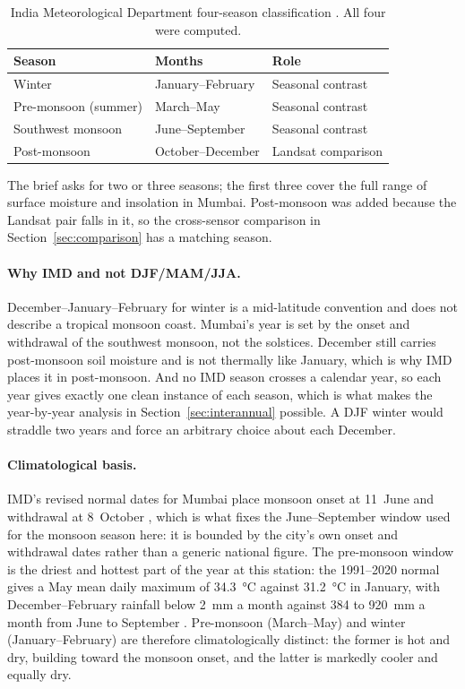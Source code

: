 \documentclass[11pt,a4paper]{article}
\begin{document}
\begin{table}[htbp]
\centering
\begin{tabular}{lll}
\toprule
\textbf{Season} & \textbf{Months} & \textbf{Role} \\
\midrule
Winter               & January--February & Seasonal contrast \\
Pre-monsoon (summer) & March--May        & Seasonal contrast \\
Southwest monsoon    & June--September   & Seasonal contrast \\
Post-monsoon         & October--December & Landsat comparison \\
\bottomrule
\end{tabular}
\caption{India Meteorological Department four-season classification
\cite{imd_seasons}. All four were computed.}
\label{tab:seasons}
\end{table}

The brief asks for two or three seasons; the first three cover the
full range of surface moisture and insolation in Mumbai. Post-monsoon
was added because the Landsat pair falls in it, so the cross-sensor
comparison in Section~\ref{sec:comparison} has a matching season.

\paragraph{Why IMD and not DJF/MAM/JJA.}
December--January--February for winter is a mid-latitude convention
and does not describe a tropical monsoon coast. Mumbai's year is set
by the onset and withdrawal of the southwest monsoon, not the
solstices. December still carries post-monsoon soil moisture and is
not thermally like January, which is why IMD places it in
post-monsoon. And no IMD season crosses a calendar year, so each year
gives exactly one clean instance of each season, which is what
makes the year-by-year analysis in Section~\ref{sec:interannual}
possible. A DJF winter would straddle two years and force an arbitrary
choice about each December.

\paragraph{Climatological basis.}
IMD's revised normal dates for Mumbai place monsoon onset at
11~June and withdrawal at 8~October \cite{imd_onset_withdrawal},
which is what fixes the June--September window used for the monsoon
season here: it is bounded by the city's own onset and withdrawal
dates rather than a generic national figure. The pre-monsoon window is
the driest and hottest part of the year at this station: the
1991--2020 normal gives a May mean daily maximum of
\SI{34.3}{\degreeCelsius} against \SI{31.2}{\degreeCelsius} in
January, with December--February rainfall below
\SI{2}{\milli\metre} a month against \SI{384}{} to
\SI{920}{\milli\metre} a month from June to September
\cite{imd_climate_normals}. Pre-monsoon (March--May) and winter
(January--February) are therefore climatologically distinct: the
former is hot and dry, building toward the monsoon onset, and the
latter is markedly cooler and equally dry.
\end{document}
